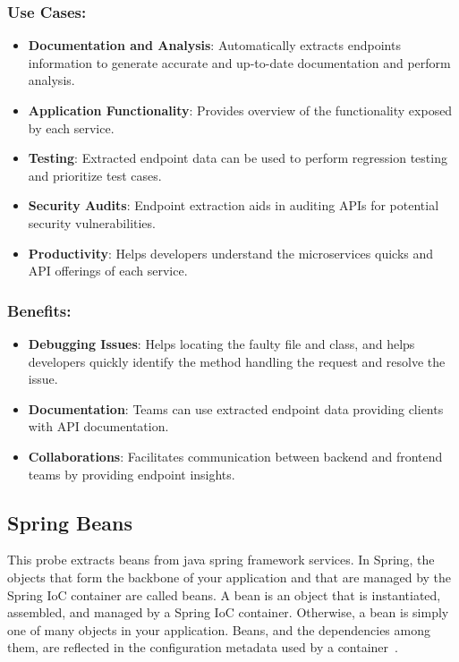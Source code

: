 \subsubsection{Use Cases:}
\begin{itemize}[label=$\bullet$]
	\item \textbf{Documentation and Analysis}: Automatically extracts endpoints information to generate accurate and up-to-date documentation and perform analysis.
	\item \textbf{Application Functionality}: Provides overview of the functionality exposed by each service.
	\item \textbf{Testing}: Extracted endpoint data can be used to perform regression testing and prioritize test cases.
	\item \textbf{Security Audits}: Endpoint extraction aids in auditing APIs for potential security vulnerabilities.
	\item \textbf{Productivity}: Helps developers understand the microservices quicks and API offerings of each service.
\end{itemize}
\subsubsection{Benefits:}
\begin{itemize}[label=$\bullet$]
	\item \textbf{Debugging Issues}: Helps locating the faulty file and class, and helps developers quickly identify the method handling the request and resolve the issue.
	\item \textbf{Documentation}: Teams can use extracted endpoint data providing clients with API documentation.
	\item \textbf{Collaborations}: Facilitates communication between backend and frontend teams by providing endpoint insights.
\end{itemize} 

\subsection{Spring Beans}
This probe extracts beans from java spring framework services. In Spring, the objects that form the backbone of your application and that are managed by the Spring IoC container are called beans. A bean is an object that is instantiated, assembled, and managed by a Spring IoC container. Otherwise, a bean is simply one of many objects in your application. Beans, and the dependencies among them, are reflected in the configuration metadata used by a container~\citep{spring_beans_intro}.
